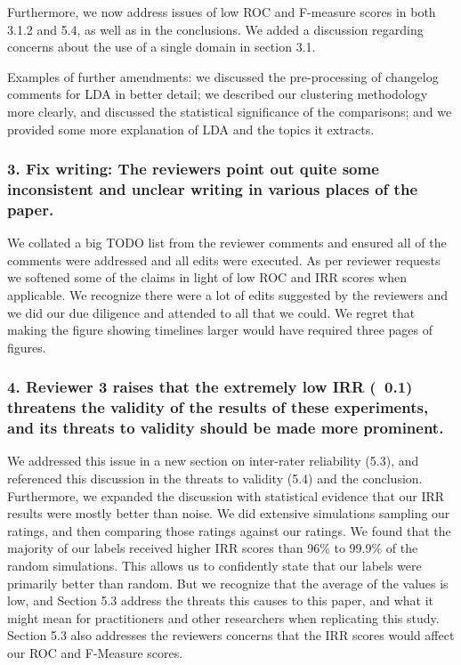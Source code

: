 \documentclass{article}
\begin{document}
Furthermore, we now address issues of low ROC and F-measure scores in
both 3.1.2 and 5.4, as well as in the conclusions. We added a discussion regarding concerns about the use of a single domain in section 3.1.

Examples of further amendments: we discussed the pre-processing
of changelog comments for LDA in better detail; we described our
clustering methodology more clearly, and discussed the statistical significance of
the comparisons; and we provided some more explanation of LDA and the
topics it extracts.

\subsubsection*{
  3. Fix writing: The reviewers point out quite some inconsistent and
  unclear writing in various places of the paper.}

We collated a big TODO list from the reviewer comments and ensured all of
the comments were addressed and all edits were executed. 
As per reviewer requests we softened some of the claims in light of low ROC and IRR scores when applicable.
We recognize there were a lot of edits suggested by the reviewers and
we did our due diligence and attended to all that we could. We regret that making the figure showing timelines 
larger would have required three pages of figures. 

\subsubsection*{4.  Reviewer 3 raises that the extremely low IRR (~0.1) threatens the
   validity of the results of these experiments, and its threats to
   validity should be made more prominent.}

We addressed this issue in a new section on inter-rater
reliability (5.3), and referenced this discussion in the threats to
validity (5.4) and the conclusion.  Furthermore, we expanded the discussion with statistical evidence that our IRR results were mostly
better than noise. We did extensive simulations sampling our ratings,
and then comparing those ratings against our ratings. We found that the
majority of our labels received higher IRR scores than 96\% to 99.9\%
of the random simulations. This allows us to confidently state that our
labels were primarily better than random. But we recognize that the
average of the values is low, and Section 5.3 address the threats this causes to
this paper, and what it might mean for practitioners and other
researchers when replicating this study. Section 5.3 also addresses the reviewers concerns that the IRR scores would
affect our ROC and F-Measure scores. 
\end{document}
